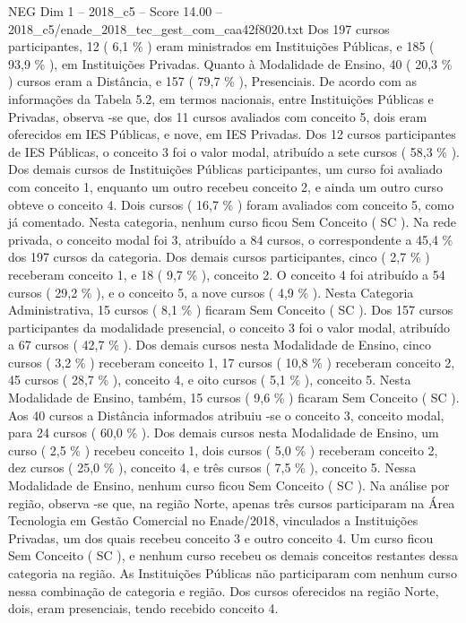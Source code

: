 \begin{textsample}{NEG Dim 1 – 2018\_c5 – Score 14.00 – 2018\_c5/enade\_2018\_tec\_gest\_com\_caa42f8020.txt}
Dos 197 cursos participantes, 12 ( 6,1 \% ) eram ministrados em Instituições Públicas, e 185 ( 93,9 \% ), em Instituições Privadas.
Quanto à Modalidade de Ensino, 40 ( 20,3 \% ) cursos eram a Distância, e 157 ( 79,7 \% ), Presenciais.
De acordo com as informações da Tabela 5.2, em termos nacionais, entre Instituições Públicas e Privadas, observa -se que, dos 11 cursos avaliados com conceito 5, dois eram oferecidos em IES Públicas, e nove, em IES Privadas.
Dos 12 cursos participantes de IES Públicas, o conceito 3 foi o valor modal, atribuído a sete cursos ( 58,3 \% ).
Dos demais cursos de Instituições Públicas participantes, um curso foi avaliado com conceito 1, enquanto um outro recebeu conceito 2, e ainda um outro curso obteve o conceito 4.
Dois cursos ( 16,7 \% ) foram avaliados com conceito 5, como já comentado.
Nesta categoria, nenhum curso ficou Sem Conceito ( SC ).
Na rede privada, o conceito modal foi 3, atribuído a 84 cursos, o correspondente a 45,4 \% dos 197 cursos da categoria.
Dos demais cursos participantes, cinco ( 2,7 \% ) receberam conceito 1, e 18 ( 9,7 \% ), conceito 2.
O conceito 4 foi atribuído a 54 cursos ( 29,2 \% ), e o conceito 5, a nove cursos ( 4,9 \% ).
Nesta Categoria Administrativa, 15 cursos ( 8,1 \% ) ficaram Sem Conceito ( SC ).
Dos 157 cursos participantes da modalidade presencial, o conceito 3 foi o valor modal, atribuído a 67 cursos ( 42,7 \% ).
Dos demais cursos nesta Modalidade de Ensino, cinco cursos ( 3,2 \% ) receberam conceito 1, 17 cursos ( 10,8 \% ) receberam conceito 2, 45 cursos ( 28,7 \% ), conceito 4, e oito cursos ( 5,1 \% ), conceito 5.
Nesta Modalidade de Ensino, também, 15 cursos ( 9,6 \% ) ficaram Sem Conceito ( SC ).
Aos 40 cursos a Distância informados atribuiu -se o conceito 3, conceito modal, para 24 cursos ( 60,0 \% ).
Dos demais cursos nesta Modalidade de Ensino, um curso ( 2,5 \% ) recebeu conceito 1, dois cursos ( 5,0 \% ) receberam conceito 2, dez cursos ( 25,0 \% ), conceito 4, e três cursos ( 7,5 \% ), conceito 5.
Nessa Modalidade de Ensino, nenhum curso ficou Sem Conceito ( SC ).
Na análise por região, observa -se que, na região Norte, apenas três cursos participaram na Área Tecnologia em Gestão Comercial no Enade/2018, vinculados a Instituições Privadas, um dos quais recebeu conceito 3 e outro conceito 4.
Um curso ficou Sem Conceito ( SC ), e nenhum curso recebeu os demais conceitos restantes dessa categoria na região.
As Instituições Públicas não participaram com nenhum curso nessa combinação de categoria e região.
Dos cursos oferecidos na região Norte, dois, eram presenciais, tendo recebido conceito 4.

\end{textsample}
